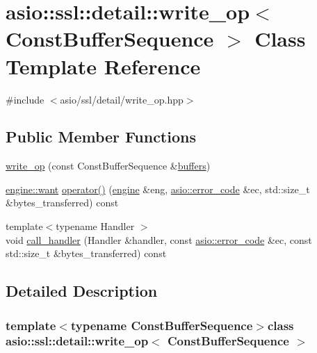 \hypertarget{classasio_1_1ssl_1_1detail_1_1write__op}{}\section{asio\+:\+:ssl\+:\+:detail\+:\+:write\+\_\+op$<$ Const\+Buffer\+Sequence $>$ Class Template Reference}
\label{classasio_1_1ssl_1_1detail_1_1write__op}


{\ttfamily \#include $<$asio/ssl/detail/write\+\_\+op.\+hpp$>$}

\subsection*{Public Member Functions}
\begin{DoxyCompactItemize}
\item 
\hyperlink{classasio_1_1ssl_1_1detail_1_1write__op_afa8530168fa8d8cd45bd9a66ab61c4a7}{write\+\_\+op} (const Const\+Buffer\+Sequence \&\hyperlink{group__async__read_ga54dede45c3175148a77fe6635222c47d}{buffers})
\item 
\hyperlink{classasio_1_1ssl_1_1detail_1_1engine_ab9812153941a6a93c9095f4e5ca8f915}{engine\+::want} \hyperlink{classasio_1_1ssl_1_1detail_1_1write__op_a66d1d76908822cc59b1684e60b299d35}{operator()} (\hyperlink{classasio_1_1ssl_1_1detail_1_1engine}{engine} \&eng, \hyperlink{classasio_1_1error__code}{asio\+::error\+\_\+code} \&ec, std\+::size\+\_\+t \&bytes\+\_\+transferred) const 
\item 
{\footnotesize template$<$typename Handler $>$ }\\void \hyperlink{classasio_1_1ssl_1_1detail_1_1write__op_a6422f60bcac30ff83dd205cbcd6c1328}{call\+\_\+handler} (Handler \&handler, const \hyperlink{classasio_1_1error__code}{asio\+::error\+\_\+code} \&ec, const std\+::size\+\_\+t \&bytes\+\_\+transferred) const 
\end{DoxyCompactItemize}


\subsection{Detailed Description}
\subsubsection*{template$<$typename Const\+Buffer\+Sequence$>$class asio\+::ssl\+::detail\+::write\+\_\+op$<$ Const\+Buffer\+Sequence $>$}



